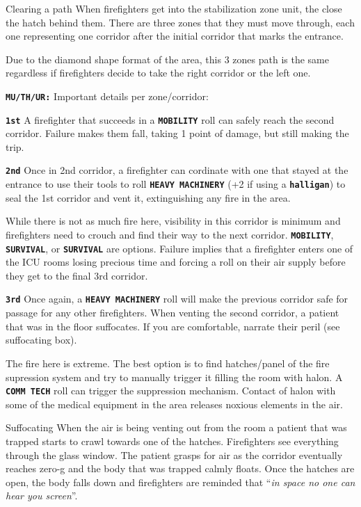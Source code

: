 \begin{rpg-commentbox}{Clearing a path}
    When firefighters get into the stabilization zone unit, the close the hatch behind them. There are three zones that they must  move through, each one representing one corridor after the initial corridor that marks the entrance.
    
    Due to the diamond shape format of the area, this 3 zones path is the same regardless if firefighters decide to take the right corridor or the left one.
    
    \texttt{\textbf{MU/TH/UR:}} Important details per zone/corridor:
    
    \texttt{\textbf{1st}} A firefighter that succeeds in a \texttt{\textbf{MOBILITY}} roll can safely reach the second corridor. Failure makes them fall, taking 1 point of damage, but still making the trip.

    \texttt{\textbf{2nd}} Once in 2nd corridor, a firefighter can cordinate with one that stayed at the entrance to use their tools to roll \texttt{\textbf{HEAVY MACHINERY}} (+2 if using a  \texttt{\textbf{halligan}}) to seal the 1st corridor and vent it, extinguishing any fire in the area. 

    While there is not as much fire here, visibility in this corridor is minimum and firefighters need to crouch and find their way to the next corridor. 
    \texttt{\textbf{MOBILITY}}, \texttt{\textbf{SURVIVAL}}, or \texttt{\textbf{SURVIVAL}} are options. Failure implies that a firefighter enters one of the ICU rooms losing precious time and forcing a roll on their air supply before they get to the final 3rd corridor.  

    \texttt{\textbf{3rd}} Once again, a \texttt{\textbf{HEAVY MACHINERY}} roll will make the previous corridor safe for passage for any other firefighters. When venting the second corridor, a patient that was in the floor suffocates. If you are comfortable, narrate their peril (see suffocating box).
    
    The fire here is extreme. The best option is to find hatches/panel of the fire supression system and try to manually trigger it filling the room with halon. 
    A \texttt{\textbf{COMM TECH}} roll can trigger the suppression mechanism.
    Contact of halon with some of the medical equipment in the area releases 
    noxious elements in the air. 
\end{rpg-commentbox}  


\begin{rpg-warnbox}{Suffocating}
    When the air is being venting out from the room a patient that was trapped starts to crawl towards one of the hatches. Firefighters see everything through the glass window. The patient grasps for air as the corridor eventually reaches zero-g and the body that was trapped calmly floats. Once the hatches are open, the body falls down and firefighters are reminded that ``\textit{in space no one can hear you screen}''.
\end{rpg-warnbox}
  

